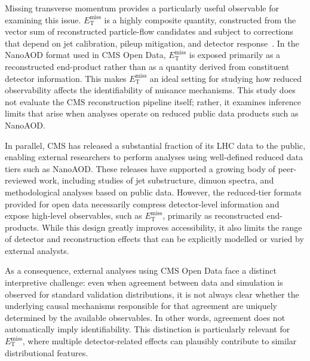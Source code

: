 \documentclass[a4paper,11pt]{article}
\newcommand{\MET}{\ensuremath{E_{\mathrm{T}}^{\mathrm{miss}}}\xspace}
\begin{document}
Missing transverse momentum provides a particularly useful observable for
examining this issue.
\MET is a highly composite quantity, constructed from the vector sum of
reconstructed particle-flow candidates and subject to corrections that depend
on jet calibration, pileup mitigation, and detector response~\cite{CMS:JES2017}.
In the NanoAOD format used in CMS Open Data, \MET is exposed primarily as a
reconstructed end-product rather than as a quantity derived from constituent
detector information.
This makes \MET an ideal setting for studying how reduced observability
affects the identifiability of nuisance mechanisms.
This study does not evaluate the CMS reconstruction pipeline itself; rather,
it examines inference limits that arise when analyses operate on reduced
public data products such as NanoAOD.

In parallel, CMS has released a substantial fraction of its LHC data to the
public, enabling external researchers to perform analyses using well-defined
reduced data tiers such as NanoAOD.
These releases have supported a growing body of peer-reviewed work, including
studies of jet substructure, dimuon spectra, and methodological analyses
based on public data.
However, the reduced-tier formats provided for open data necessarily compress
detector-level information and expose high-level observables, such as \MET,
primarily as reconstructed end-products.
While this design greatly improves accessibility, it also limits the range of
detector and reconstruction effects that can be explicitly modelled or varied
by external analysts.

As a consequence, external analyses using CMS Open Data face a distinct
interpretive challenge: even when agreement between data and simulation is
observed for standard validation distributions, it is not always clear whether
the underlying causal mechanisms responsible for that agreement are uniquely
determined by the available observables.
In other words, agreement does not automatically imply identifiability.
This distinction is particularly relevant for \MET, where multiple
detector-related effects can plausibly contribute to similar distributional
features.
\end{document}
